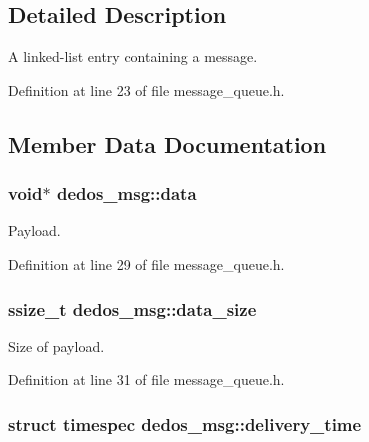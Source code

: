 \subsection{Detailed Description}
A linked-\/list entry containing a message. 

Definition at line 23 of file message\-\_\-queue.\-h.



\subsection{Member Data Documentation}
\hypertarget{structdedos__msg_a91f31ca1c757b98cbc2de7bf7c18cb49}{
\subsubsection[{data}]{\setlength{\rightskip}{0pt plus 5cm}void$\ast$ dedos\-\_\-msg\-::data}}\label{structdedos__msg_a91f31ca1c757b98cbc2de7bf7c18cb49}


Payload. 



Definition at line 29 of file message\-\_\-queue.\-h.

\hypertarget{structdedos__msg_a336dcb0b72f421b1e99dc23f76d4bcd1}{
\subsubsection[{data\-\_\-size}]{\setlength{\rightskip}{0pt plus 5cm}ssize\-\_\-t dedos\-\_\-msg\-::data\-\_\-size}}\label{structdedos__msg_a336dcb0b72f421b1e99dc23f76d4bcd1}


Size of payload. 



Definition at line 31 of file message\-\_\-queue.\-h.

\hypertarget{structdedos__msg_a178267be123a7471f2ec7e4a74d598fd}{
\subsubsection[{delivery\-\_\-time}]{\setlength{\rightskip}{0pt plus 5cm}struct timespec dedos\-\_\-msg\-::delivery\-\_\-time}}\label{structdedos__msg_a178267be123a7471f2ec7e4a74d598fd}


